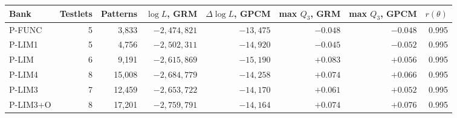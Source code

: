 \begin{center}\footnotesize
\begin{tabular}{@{}lrrrrrrr@{}}
\toprule
Bank & Testlets & Patterns & $\log L$, GRM & $\Delta\log L$, GPCM & max $Q_3$, GRM & max $Q_3$, GPCM & $r(\theta)$ \\
\midrule
P-FUNC & 5 & 3{,}833 & $-2{,}474{,}821$ & $-13{,}475$ & $-0.048$ & $-0.048$ & 0.995 \\
P-LIM1 & 5 & 4{,}756 & $-2{,}502{,}311$ & $-14{,}920$ & $-0.045$ & $-0.052$ & 0.995 \\
P-LIM & 6 & 9{,}191 & $-2{,}615{,}869$ & $-15{,}190$ & $+0.083$ & $+0.056$ & 0.995 \\
P-LIM4 & 8 & 15{,}008 & $-2{,}684{,}779$ & $-14{,}258$ & $+0.074$ & $+0.066$ & 0.995 \\
P-LIM3 & 7 & 12{,}459 & $-2{,}653{,}722$ & $-14{,}170$ & $+0.061$ & $+0.052$ & 0.995 \\
P-LIM3+O & 8 & 17{,}201 & $-2{,}759{,}791$ & $-14{,}164$ & $+0.074$ & $+0.076$ & 0.995 \\
\bottomrule
\end{tabular}
\end{center}
